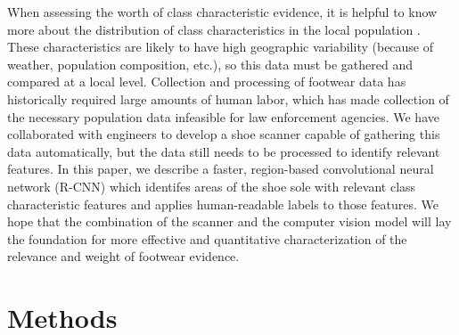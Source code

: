 \documentclass[10pt]{article}
\newcommand{\svp}[1]{{\textcolor{RedOrange}{#1}}}
\begin{document}

\svp{
When assessing the worth of class characteristic evidence, it is helpful to know more about the distribution of class characteristics in the local population \cite{grossVariabilitySignificanceClass2013}.
These characteristics are likely to have high geographic variability (because of weather, population composition, etc.), so this data must be gathered and compared at a local level.
Collection and processing of footwear data has historically required large amounts of human labor, which has made collection of the necessary population data infeasible for law enforcement agencies.
We have collaborated with engineers to develop a shoe scanner capable of gathering this data automatically, but the data still needs to be processed to identify relevant features.
In this paper, we describe a faster, region-based convolutional neural network (R-CNN) \cite{girshickFastRCNN2015} which identifes areas of the shoe sole with relevant class characteristic features and applies human-readable labels to those features.
We hope that the combination of the scanner and the computer vision model will lay the foundation for more effective and quantitative characterization of the relevance and weight of footwear evidence.}



\section{Methods}
\end{document}
